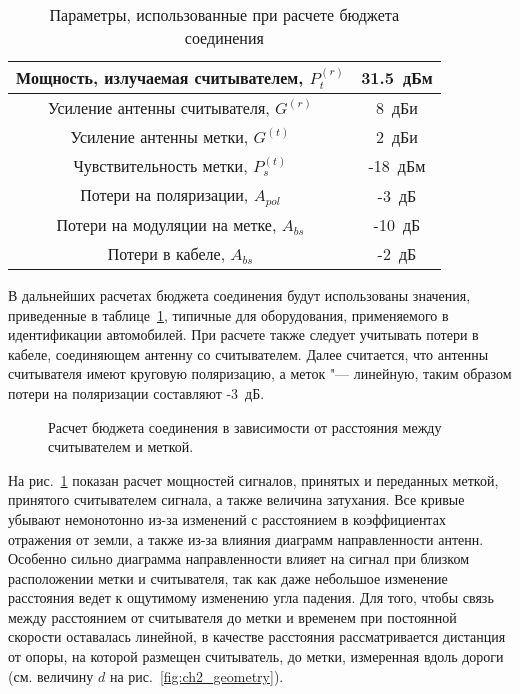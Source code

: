 \begin{table}[!t]
	\renewcommand{\arraystretch}{1.3}
	\caption{Параметры, использованные при расчете бюджета соединения}
	\label{table:ch2_budget_params}
	\centering
	\begin{tabular}{|c|c|}
		\hline
		Мощность, излучаемая считывателем, $P_t^{(r)}$ & 31.5~дБм\\
		\hline
		Усиление антенны считывателя, $G^{(r)}$ & 8~дБи\\
		\hline
		Усиление антенны метки, $G^{(t)}$ & 2~дБи\\
		\hline
		Чувствительность метки, $P_s^{(t)}$ & -18~дБм\\
		\hline
		Потери на поляризации, $A_{pol}$ & -3~дБ\\
		\hline
		Потери на модуляции на метке, $A_{bs}$ & -10~дБ\\
		\hline
		Потери в кабеле, $A_{bs}$ & -2~дБ\\
		\hline
	\end{tabular}
\end{table}

В дальнейших расчетах бюджета соединения будут использованы значения, приведенные в таблице~\ref{table:ch2_budget_params}, типичные для оборудования, применяемого в идентификации автомобилей. При расчете также следует учитывать потери в кабеле, соединяющем антенну со считывателем. Далее считается, что антенны считывателя имеют круговую поляризацию, а меток "--- линейную, таким образом потери на поляризации составляют -3~дБ.

\begin{figure}[h]
	\caption{Расчет бюджета соединения в зависимости от расстояния между считывателем и меткой.}
	\label{fig:ch2_link_budget}
\end{figure}

На рис.~\ref{fig:ch2_link_budget} показан расчет мощностей сигналов, принятых и переданных меткой, принятого считывателем сигнала, а также величина затухания. Все кривые убывают немонотонно из-за изменений с расстоянием в коэффициентах отражения от земли, а также из-за влияния диаграмм направленности антенн. Особенно сильно диаграмма направленности влияет на сигнал при близком расположении метки и считывателя, так как даже небольшое изменение расстояния ведет к ощутимому изменению угла падения. Для того, чтобы связь между расстоянием от считывателя до метки и временем при постоянной скорости оставалась линейной, в качестве расстояния рассматривается дистанция от опоры, на которой размещен считыватель, до метки, измеренная вдоль дороги (см. величину $d$ на рис.~\ref{fig:ch2_geometry}).



